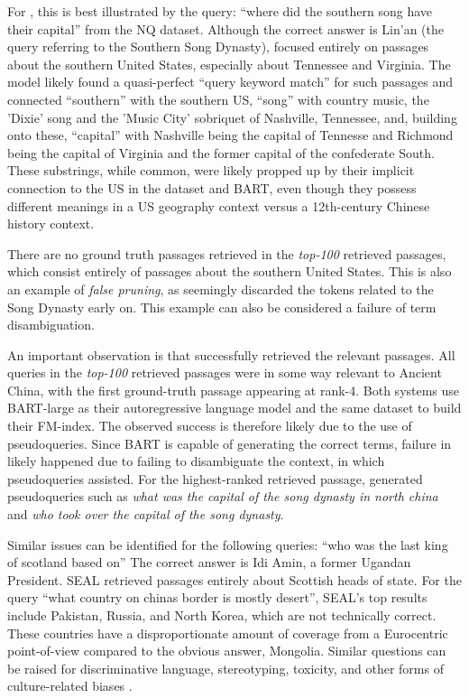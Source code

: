For , this is best illustrated by the query: ``where did the southern song have their capital'' from the NQ dataset. Although the correct answer is Lin'an (the query referring to the Southern Song Dynasty),  focused entirely on passages about the southern United States, especially about Tennessee and Virginia. The model likely
found a quasi-perfect ``query keyword match'' for such passages and connected ``southern'' with the southern US, ``song'' with country music, the 'Dixie' song and the 'Music City' sobriquet of Nashville, Tennessee, and, building onto these, ``capital'' with Nashville being the capital of Tennesse and Richmond being the capital of Virginia and the former capital of the confederate South. These substrings, while common, were likely propped up by their implicit connection to the US in the dataset and BART, even though they possess different meanings in a US geography context versus a 12th-century Chinese history context.

There are no ground truth passages retrieved in the \textit{top-100} retrieved passages, which consist entirely of passages about the southern United States. This is also an example of \textit{false pruning}, as seemingly
discarded the tokens related to the Song Dynasty early on. This example can also be considered a failure of term disambiguation. 

An important observation is that  successfully retrieved the relevant passages. All queries in the \textit{top-100} retrieved passages were in some way relevant to Ancient China, with the first ground-truth passage appearing at rank-4. Both systems use BART-large as their autoregressive language model and the same dataset to build their FM-index. The observed success is therefore likely due to the use of pseudoqueries. Since BART is capable of generating the correct terms, failure in  likely happened due to failing to disambiguate the context, in which pseudoqueries assisted. For the highest-ranked retrieved  passage,  generated pseudoqueries such as \textit{what was the capital of the song dynasty in north china} and \textit{who took over the capital of the song dynasty}.

Similar issues can be identified for the following queries: ``who was the last king of scotland based on'' The correct answer is Idi Amin, a former Ugandan President. SEAL retrieved passages entirely about Scottish heads of state. For the query ``what country on chinas border is mostly desert'', SEAL's top results include Pakistan, Russia, and North Korea, which are not technically correct. These countries have a disproportionate amount of coverage from a Eurocentric point-of-view compared to the obvious answer, Mongolia. Similar questions can be raised for discriminative language, stereotyping, toxicity, and other forms of culture-related biases \cite{gallegos-bias-and}.




